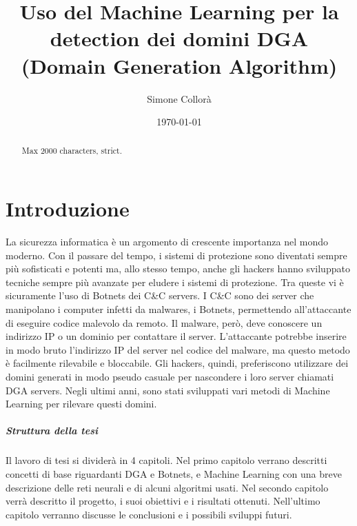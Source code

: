 \documentclass[12pt,a4paper,openright,twoside]{book}
\title{Uso del Machine Learning per la detection dei domini DGA \break (Domain Generation Algorithm)}
\author{Simone Collorà}
\date{\today}
\begin{document}
\frontmatter\frontispiece
\nocite{*}

\begin{abstract}	
Max 2000 characters, strict.
\end{abstract}



\tableofcontents   
\listoffigures     %

\mainmatter

\chapter{Introduzione}
\label{chap:introduction}

La sicurezza informatica è un argomento di crescente importanza
nel mondo moderno. Con il passare del tempo,
i sistemi di protezione sono diventati sempre più sofisticati
e potenti ma, allo stesso tempo, anche gli hackers 
hanno sviluppato tecniche sempre più avanzate per eludere i sistemi di protezione.
Tra queste vi è sicuramente l'uso di Botnets
dei \acrfull{C&C} servers. I \acrshort{C&C} sono dei server che manipolano
i computer infetti da malwares, i Botnets, permettendo
all'attaccante di eseguire codice malevolo da remoto.
Il malware, però, deve conoscere un indirizzo IP o un dominio
per contattare il server. L'attaccante potrebbe
inserire in modo bruto l'indirizzo IP del server nel codice del malware,
ma questo metodo è facilmente rilevabile e bloccabile.
Gli hackers, quindi, preferiscono utilizzare dei domini
generati in modo pseudo casuale per nascondere i loro server chiamati
\acrfull{DGA} servers. Negli ultimi anni, sono stati sviluppati
vari metodi di Machine Learning per rilevare questi domini.



\paragraph{Struttura della tesi}
Il lavoro di tesi si dividerà in 4 capitoli. Nel primo
capitolo verrano descritti concetti di base riguardanti \acrshort{DGA} e Botnets,
e Machine Learning con una breve descrizione delle reti neurali e di alcuni
algoritmi usati. Nel secondo capitolo verrà descritto il progetto,
i suoi obiettivi e i risultati ottenuti. Nell'ultimo capitolo
verranno discusse le conclusioni e i possibili sviluppi futuri.
\end{document}
